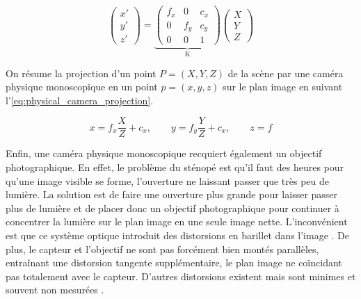 \begin{equation}
  \label{eq:projection}
  \begin{pmatrix}
    x'\\
    y'\\
    z'
  \end{pmatrix}
  =
  \underbrace{
    \begin{pmatrix}
      f_x & 0 & c_x\\
      0 & f_y & c_y\\
      0 & 0 & 1
    \end{pmatrix}
  }_\text{K}
  \begin{pmatrix}
    X\\
    Y\\
    Z
  \end{pmatrix}
\end{equation}

On résume la projection d'un point $P=(X,Y,Z)$ de la scène par une caméra physique monoscopique en un point $p=(x,y,z)$ sur le plan image en suivant l'\autoref{eq:physical_camera_projection}.

\begin{equation}
  \label{eq:physical_camera_projection}
  x = f_x \frac{X}{Z} + c_x,\qquad y = f_y \frac{Y}{Z} + c_x,\qquad z = f
\end{equation}

Enfin, une caméra physique monoscopique recquiert également un objectif photographique. En effet, le problème du sténopé est qu'il faut des heures pour qu'une image visible se forme, l'ouverture ne laissant passer que très peu de lumière. La solution est de faire une ouverture plus grande pour laisser passer plus de lumière et de placer donc un objectif photographique pour continuer à concentrer la lumière sur le plan image en une seule image nette. L'inconvénient est que ce système optique introduit des distorsions en barillet dans l'image . De plus, le capteur et l'objectif ne sont pas forcément bien montés parallèles, entraînant une distorsion tangente supplémentaire, le plan image ne coïncidant pas totalement avec le capteur. D'autres distorsions existent mais sont minimes et souvent non mesurées \citep[p.377]{Bradski2008}.


